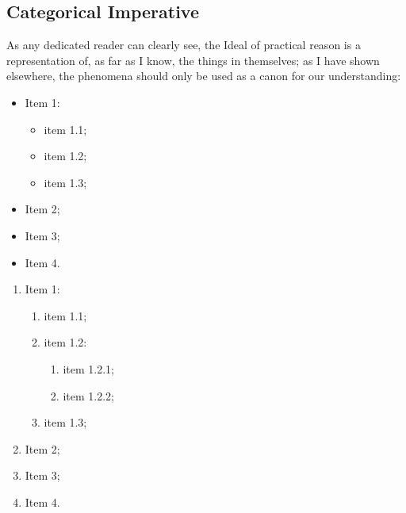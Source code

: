 \subsection{Categorical Imperative}
As any dedicated reader can clearly see, the Ideal of practical reason is a representation of, as far as I know, the things in themselves; as I have shown elsewhere, the phenomena should only be used as a canon for our understanding:
\begin{itemize}
    \item Item 1:
    \begin{itemize}[label=---]
        \item item 1.1;
        \item item 1.2;
        \item item 1.3;
    \end{itemize}
    \item Item 2;
    \item Item 3;
    \item Item 4.
\end{itemize}
\kant[2]
\begin{enumerate}
    \item Item 1:
    \begin{enumerate}
        \item item 1.1;
        \item item 1.2:
        \begin{enumerate}
            \item item 1.2.1;
            \item item 1.2.2;
        \end{enumerate}
        \item item 1.3;
    \end{enumerate}
    \item Item 2;
    \item Item 3;
    \item Item 4.
\end{enumerate}

\kant[9]

